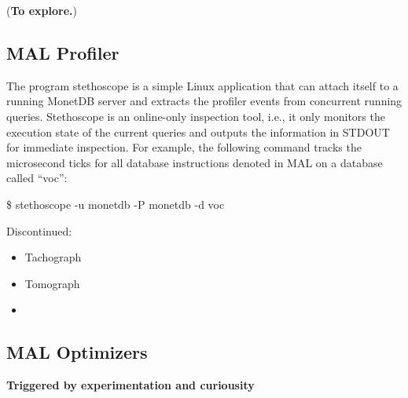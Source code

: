 \documentclass[11pt]{article}
\begin{document}
(\textbf{To explore.})

\subsection{MAL Profiler}
\label{sec:org2a43833}

The program stethoscope is a simple Linux application that can attach itself to a running MonetDB server and extracts
the profiler events from concurrent running queries. Stethoscope is an online-only inspection tool, i.e., it only
monitors the execution state of the current queries and outputs the information in STDOUT for immediate inspection.
For example, the following command tracks the microsecond ticks for all database instructions denoted in MAL on a database called “voc”:

\$ stethoscope -u monetdb -P monetdb -d voc

Discontinued:
\begin{itemize}
\item Tachograph
\item Tomograph
\item 
\end{itemize}

\subsection{MAL Optimizers}
\label{sec:org31c07fd}
\textbf{Triggered by experimentation and curiousity}
\end{document}
